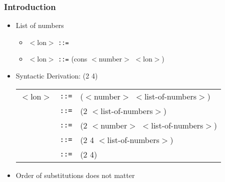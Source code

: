 \documentclass{beamer}
\newcommand{\elist}{\texttt{\textquotesingle{()}}}
\newcommand{\is}{\texttt{::=}}
\begin{document}
\begin{frame}[fragile]
\frametitle{Introduction}
\begin{scriptsize}
\begin{itemize}
\item<1-> List of numbers
  \begin{itemize}
    \item $<$lon$>$ \is{} \elist{} \newline
    \item $<$lon$>$ \is{} (cons $<$number$>$ $<$lon$>$)
  \end{itemize}

\item<2-> Syntactic Derivation: (2 4)
  \begin{tabular}{lll}
    $<$lon$>$ & \is{} & ($<$number$>$  $<$list-of-numbers$>$) \\
     & \is{} & (2  $<$list-of-numbers$>$) \\
     & \is{} & (2  $<$number$>$ $<$list-of-numbers$>$) \\
     & \is{} & (2  4 $<$list-of-numbers$>$) \\
     & \is{} & (2  4) \\
  \end{tabular}

\item<2-> Order of substitutions does not matter

\end{itemize}
\end{scriptsize}
\end{frame}
\end{document}
